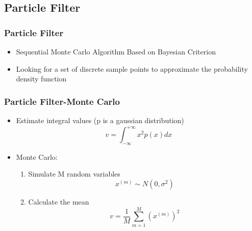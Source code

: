 \documentclass[14pt,hyperref={CJKbookmarks=true}]{beamer}
\theoremstyle{plain}
\theoremstyle{definition}
\theoremstyle{remark}
\begin{document}
\subsection{Particle Filter}




\begin{frame}
\small \frametitle{Particle Filter}
\begin{itemize}
\item Sequential Monte Carlo Algorithm Based on Bayesian Criterion
\item Looking for a set of discrete sample points to approximate the
    probability density function
\end{itemize}
\end{frame}


\begin{frame}
\small \frametitle{Particle Filter-Monte Carlo}
\begin{itemize}
\item Estimate integral values (p is a gaussian distribution)
\begin{equation*}
v = \int_{-\infty}^{+\infty}{x^2p(x)dx}
\end{equation*}
\end{itemize}
\begin{itemize}
\item Monte Carlo:
\begin{enumerate}
\item Simulate M random variables
\begin{equation*}
x^{(m)}\sim N(0,\sigma^2)
\end{equation*}
\item Calculate the mean
\begin{equation*}
v = \frac{1}{M}\sum_{m=1}^{M}{(x^{(m)})}^2
\end{equation*}
\end{enumerate}
\end{itemize}
\end{frame}
\end{document}
